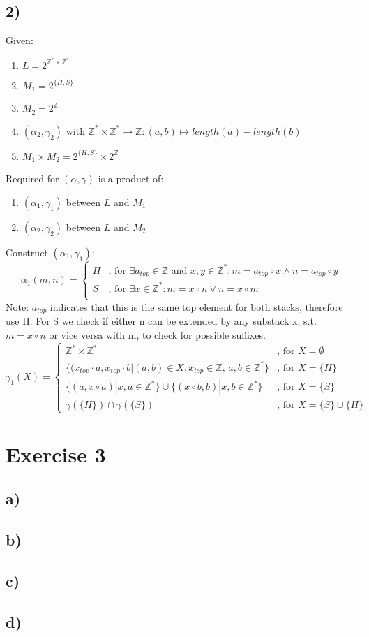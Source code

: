 \documentclass[fleqn,12pt]{article}
\begin{document}
\subsection*{2)}
Given:
\begin{enumerate}
	\item $L = 2^{\mathbb{Z^{*}} \times \mathbb{Z^{*}}}$
	\item $M_1 = 2^{\{H,S\}}$
	\item $M_2 = 2^{\mathbb{Z}}$
	\item $(\alpha_2,\gamma_2) \text{ with } \mathbb{Z}^* \times \mathbb{Z}^* \rightarrow \mathbb{Z}:(a,b)\mapsto length(a) - length(b)$
	\item $M_1 \times M_2 = 2^{\{H,S\}} \times 2^{\mathbb{Z}}$
\end{enumerate}
Required for $(\alpha,\gamma)$ is a product of:
	\begin{enumerate}
		\item $(\alpha_1,\gamma_1)$ between $L$ and $M_1$
		\item $(\alpha_2,\gamma_2)$ between $L$ and $M_2$
	\end{enumerate}
Construct $(\alpha_1,\gamma_1)$:
  \[
    \alpha_1(m,n) =
    \begin{cases}
         H & \text{, for } \exists a_{top}  \in \mathbb{Z} \text{ and }x,y\in \mathbb{Z}^*: m = a_{top} \circ x \land n = a_{top} \circ y \\
         S & \text{, for } \exists x  \in \mathbb{Z}^*: m = x \circ n \lor n = x \circ m \\
    \end{cases}
  \]
  Note: $a_{top}$ indicates that this is the same top element for both stacks, therefore use H. For S we check if either n can be extended by any substack x, s.t. $m=x \circ n$ or vice versa with m, to check for possible suffixes.
    \[
    \gamma_1(X) =
    \begin{cases}
        \mathbb{Z}^* \times \mathbb{Z}^* & \text{, for } X=\emptyset\\
        \{(x_{top} \cdot a, x_{top} \cdot b | (a,b)\in X ,x_{top} \in \mathbb{Z}\text{, } a,b \in \mathbb{Z}^*\} & \text{, for } X=\{H\} \\
        \{(a,x \circ a) | x,a \in \mathbb{Z}^*\} \cup \{(x \circ b,b)|x,b \in \mathbb{Z}^*\} & \text{, for } X=\{S\}\\
        \gamma(\{H\}) \cap \gamma(\{S\}) & \text{, for } X=\{S\}\cup\{H\}
    \end{cases}
  \]  
\section*{Exercise 3}
\subsection*{a)}

\subsection*{b)}

\subsection*{c)}

\subsection*{d)}
\end{document}
